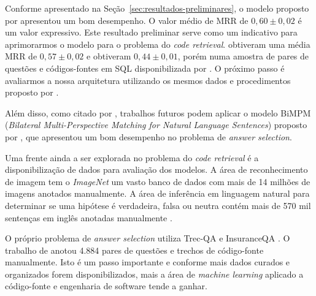 \documentclass[12pt]{article}
\begin{document}
Conforme apresentado na Seção~\ref{sec:resultados-preliminares}, o modelo proposto por \cite{tan-lstm-qa} apresentou um bom desempenho. O valor médio de MRR de $0,60 \pm 0,02$ é um valor expressivo. Este resultado preliminar serve como um indicativo para aprimorarmos o modelo para o problema do \textit{code retrieval}. \cite{Yao-staqc:2018} obtiveram uma média MRR de $0,57 \pm 0,02$ e \cite{iyer-etal-2016-summarizing} obtiveram $0,44 \pm 0,01$, porém numa amostra de pares de questões e códigos-fontes em SQL disponibilizada por \cite{iyer-etal-2016-summarizing}. O próximo passo é avaliarmos a nossa arquitetura utilizando os mesmos dados e procedimentos proposto por \cite{Yao-staqc:2018}. 

Além disso, como citado por \cite{lai-etal-2018-review}, trabalhos futuros podem aplicar o modelo BiMPM (\textit{Bilateral Multi-Perspective Matching for Natural Language Sentences}) proposto por \cite{wang-BiMPM-2017}, que apresentou um bom desempenho no problema de \textit{answer selection}.

Uma frente ainda a ser explorada no problema do \textit{code retrieval} é a disponibilização de dados para avaliação dos modelos. A área de reconhecimento de imagem tem o \textit{ImageNet} \cite{imagenet_cvpr09} um vasto banco de dados com mais de 14 milhões de imagens anotados manualmente. A área de inferência em linguagem natural para determinar se uma hipótese é verdadeira, falsa ou neutra contém mais de 570 mil sentenças em inglês anotadas manualmente \cite{snli:emnlp2015}. 

O próprio problema de \textit{answer selection} utiliza Trec-QA \cite{wang-etal-2007-jeopardy} e InsuranceQA \cite{feng-answer-selection-2015}. O trabalho de \cite{Yao-staqc:2018} anotou 4.884 pares de questões e trechos de código-fonte manualmente. Isto é um passo importante e conforme mais dados curados e organizados forem disponibilizados, mais a área de \textit{machine learning} aplicado a código-fonte e engenharia de software tende a ganhar.







\end{document}

